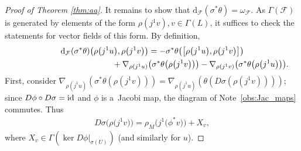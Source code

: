 \documentclass[pdftex]{sigma}
\numberwithin{equation}{section}
\newcommand{\de}{\mathrm{d}} %
\begin{document}
\begin{proof}[Proof of Theorem \ref{thm:aa}]
It remains to show that $\de_\mathcal{F}(\sigma^*\theta)=\omega_{\mathcal{F}}$. As $\Gamma(\mathcal{F})$ is generated by elements of the form $\rho(j^1v),v\in\Gamma(L)$, it suf\/f\/ices to check the statements for vector f\/ields of this form. By def\/inition,
\begin{gather}
 \de_{\mathcal{F}}(\sigma^*\theta)\big(\rho\big(j^1u\big),\rho\big(j^1v\big)\big)
 = -\sigma^*\theta\big(\big[\rho\big(j^1u\big), \rho\big(j^1v\big)\big]\big)\nonumber\\
 \hphantom{\de_{\mathcal{F}}(\sigma^*\theta)\big(\rho\big(j^1u\big),\rho\big(j^1v\big)\big)=}{} +
 {\nabla}_{\rho(j^1u)}\big(\sigma^*\theta\big(\rho\big(j^1v\big)\big)\big) - {\nabla}_{\rho(j^1v)}\big(\sigma^*\theta\big(\rho\big(j^1u\big)\big)\big). \label{eq:30}
\end{gather}
First, consider $ {\nabla}_{\rho(j^1u)}(\sigma^*\theta(\rho(j^1v))) ={\nabla}_{\rho(j^1u)}(\theta(D\sigma(\rho(j^1v))))$; since $D\phi \circ D\sigma = {\rm id}$ and $\phi$ is a~Jacobi map, the diagram of Note~\ref{obs:Jac_maps} commutes. Thus
\begin{gather*}
 D\sigma\big(\rho\big(j^1v\big)\big) = \rho_M\big(j^1\big(\phi^*v\big)\big) + X_v,
\end{gather*}
where $X_v \in \Gamma(\ker D\phi|_{\sigma(U)})$ (and similarly for $u$).


\end{proof}
\end{document}
